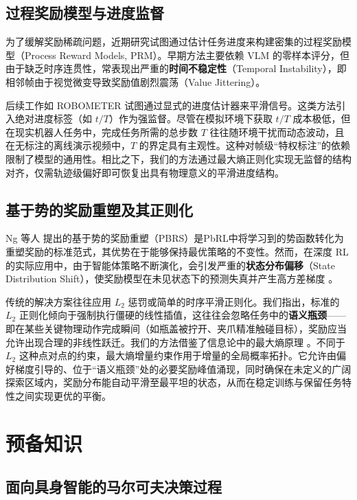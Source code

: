 \subsection{过程奖励模型与进度监督}

为了缓解奖励稀疏问题，近期研究试图通过估计任务进度来构建密集的过程奖励模型（Process Reward Models, PRM）。早期方法主要依赖 VLM 的零样本评分，但由于缺乏时序连贯性，常表现出严重的\textbf{时间不稳定性}（Temporal Instability），即相邻帧由于视觉微变导致奖励值剧烈震荡（Value Jittering）。

后续工作如 ROBOMETER \cite{robometer2026} 试图通过显式的进度估计器来平滑信号。这类方法引入绝对进度标签（如 $t/T$）作为强监督。尽管在模拟环境下获取 $t/T$ 成本极低，但在现实机器人任务中，完成任务所需的总步数 $T$ 往往随环境干扰而动态波动，且在无标注的离线演示视频中，$T$ 的界定具有主观性。这种对帧级“特权标注”的依赖限制了模型的通用性。相比之下，我们的方法通过最大熵正则化实现无监督的结构对齐，仅需轨迹级偏好即可恢复出具有物理意义的平滑进度结构。

\subsection{基于势的奖励重塑及其正则化}
\label{sec:pbrs_regularization}

Ng 等人 \cite{ng1999policy} 提出的基于势的奖励重塑（PBRS）是PbRL中将学习到的势函数转化为重塑奖励的标准范式，其优势在于能够保持最优策略的不变性。然而，在深度 RL 的实际应用中，由于智能体策略不断演化，会引发严重的\textbf{状态分布偏移}（State Distribution Shift），使奖励模型在未见状态下的预测失真并产生高方差梯度 \cite{liang2022rune}。

传统的解决方案往往应用 $L_2$ 惩罚或简单的时序平滑正则化。我们指出，标准的 $L_2$ 正则化倾向于强制执行僵硬的线性插值，这往往会忽略任务中的\textbf{语义瓶颈}——即在某些关键物理动作完成瞬间（如瓶盖被拧开、夹爪精准触碰目标），奖励应当允许出现合理的非线性跃迁。我们的方法借鉴了信息论中的最大熵原理 \cite{shannon1948, jaynes1957}。不同于 $L_2$ 这种点对点的约束，最大熵增量约束作用于增量的全局概率拓扑。它允许由偏好梯度引导的、位于“语义瓶颈”处的必要奖励峰值涌现，同时确保在未定义的广阔探索区域内，奖励分布能自动平滑至最平坦的状态，从而在稳定训练与保留任务特性之间实现更优的平衡。

\section{预备知识}

\subsection{面向具身智能的马尔可夫决策过程}

